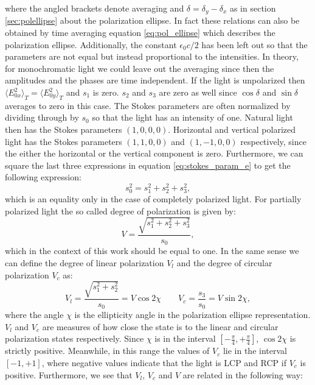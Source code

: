 where the angled brackets denote averaging and $\delta=\delta_y-\delta_x$ as in section \ref{sec:polellipse} about the polarization ellipse. In fact these relations can also be obtained by time averaging equation \ref{eq:pol_ellipse} which describes the polarization ellipse. Additionally, the constant $\epsilon_0 c / 2$ has been left out so that the parameters are not equal but instead proportional to the intensities. In theory, for monochromatic light we could leave out the averaging since then the amplitudes and the phases are time independent. If the light is unpolarized then $\langle E_{0x}^2 \rangle_T = \langle E_{0y}^2 \rangle_T$ and $s_1$ is zero. $s_2$ and $s_3$ are zero as well since $\cos \delta$ and $\sin \delta$ averages to zero in this case. The Stokes parameters are often normalized by dividing through by $s_0$ so that the light has an intensity of one. Natural light then has the Stokes parameters $(1,0,0,0)$. Horizontal and vertical polarized light has the Stokes parameters $(1,1,0,0)$ and $(1,-1,0,0)$ respectively, since the either the horizontal or the vertical component is zero. Furthermore, we can square the last three expressions in equation \ref{eq:stokes_param_e} to get the following expression:
\begin{equation}
    s_0^2 = s_1^2 + s_2^2 + s_3^2,
\end{equation}
which is an equality only in the case of completely polarized light. For partially polarized light the so called degree of polarization is given by:
\begin{equation}
    V = \frac{\sqrt{s_1^2 + s_2^2 + s_3^2}}{s_0},
\end{equation}
which in the context of this work should be equal to one. In the same sense we can define the degree of linear polarization $V_l$ and the degree of circular polarization $V_c$ as:
\begin{equation}
    V_l = \frac{\sqrt{s_1^2+s_2^2}}{s_0} = V \cos 2\chi \qquad V_c = \frac{s_3}{s_0} = V \sin 2\chi,
\end{equation}
where the angle $\chi$ is the ellipticity angle in the polarization ellipse representation. $V_l$ and $V_c$ are measures of how close the state is to the linear and circular polarization states respectively. Since $\chi$ is in the interval $\left[-\frac{\pi}{4}, +\frac{\pi}{4}\right]$, $\cos 2\chi$ is strictly positive. Meanwhile, in this range the values of $V_c$ lie in the interval $\left[-1, +1\right]$, where negative values indicate that the light is LCP and RCP if $V_c$ is positive. Furthermore, we see that $V_l$, $V_c$ and $V$ are related in the following way:
